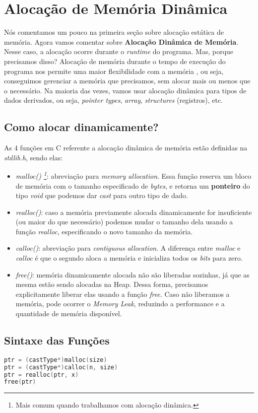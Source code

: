 \section{Alocação de Memória Dinâmica}
Nós comentamos um pouco na primeira seção sobre alocação estática de memória. Agora vamos comentar sobre
\textbf{Alocação Dinâmica de Memória}. Nesse caso, a alocação ocorre durante o \textit{runtime} do programa.
Mas, porque precisamos disso? Alocação de memória durante o tempo de execução do programa nos permite uma maior
flexibilidade com a memória \cite{geeksMemoryAllocation}, ou seja, conseguimos gerenciar a memória que precisamos, sem alocar mais
ou menos que o necessário. Na maioria das vezes, vamos usar alocação dinâmica para tipos de dados
derivados, ou seja, \textit{pointer types}, \textit{array}, \textit{structures} (registros), etc.

\subsection{Como alocar dinamicamente?}
As 4 funções em C referente a alocação dinâmica de memória estão definidas na \textit{stdlib.h}, sendo elas:
\begin{itemize}
  \item \textit{malloc() \footnote{Mais comum quando trabalhamos com alocação dinâmica.}}: abreviação para \textit{memory allocation}. Essa função reserva um bloco de memória
    com o tamanho especificado de \textit{bytes}, e retorna um \textbf{ponteiro} do tipo \textit{void}
    que podemos dar \textit{cast} para outro tipo de dado. 
  \item \textit{realloc()}: caso a memória previamente alocada dinamicamente for insuficiente (ou maior do que necessário)
    podemos mudar o tamanho dela usando a função \textit{realloc}, especificando o novo tamanho da memória.
  \item \textit{calloc()}: abreviação para \textit{contiguous allocation}. A diferença entre \textit{malloc} e \textit{calloc}
    é que o segundo aloca a memória e inicializa todos os \textit{bits} para zero.
  \item \textit{free()}: memória dinamicamente alocada não são liberadas sozinhas, já que as mesma
    estão sendo alocadas na Heap. Dessa forma, precisamos explicitamente liberar elas usando a função \textit{free}.
    Caso não liberamos a memória, pode ocorrer o \textit{Memory Leak}, reduzindo a performance e a
    quantidade de memória disponível.
\end{itemize}

\subsection{Sintaxe das Funções}
\begin{lstlisting}[language=C]
ptr = (castType*)malloc(size)
ptr = (castType*)calloc(n, size)
ptr = realloc(ptr, x)
free(ptr)
\end{lstlisting}

